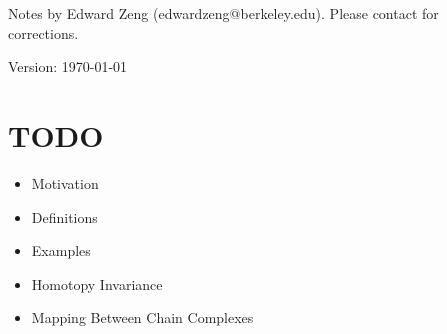 \def\topic{Simplicial Homology}



    \begin{center}
        \color{blue}
        \textsf{Notes by Edward Zeng (edwardzeng@berkeley.edu). Please contact for corrections.}

        \color{red}
        \textsf{Version: \today}
    \end{center}

    \section{TODO}
    \begin{itemize}
        \item Motivation
        \item Definitions
        \item Examples
        \item Homotopy Invariance
        \item Mapping Between Chain Complexes
    \end{itemize}


